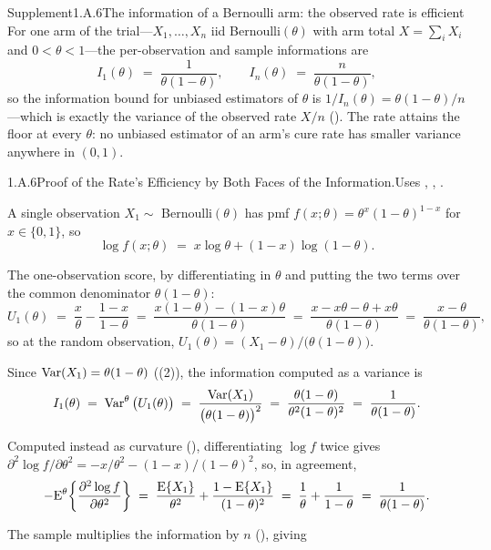 \documentclass[main.tex]{subfiles}
\begin{document}
\begin{ObjL}{Supplement}{1.A.6}{The information of a Bernoulli arm: the observed rate is efficient}
For one arm of the trial---$X_1,\dots,X_n$ iid Bernoulli$(\theta)$ with arm total
$X=\sum_i X_i$ and $0<\theta<1$---the per-observation and sample informations are
\[ I_1(\theta) \;=\; \frac{1}{\theta(1-\theta)}, \qquad
   I_n(\theta) \;=\; \frac{n}{\theta(1-\theta)} , \]
so the information bound for unbiased estimators of $\theta$ is
$1/I_n(\theta)=\theta(1-\theta)/n$---which is exactly the variance of the observed rate
$X/n$ (). The rate attains the floor at every $\theta$: no unbiased estimator of
an arm's cure rate has smaller variance anywhere in $(0,1)$.
\end{ObjL}
\begin{Prf}{1.A.6}{Proof of the Rate's Efficiency by Both Faces of the Information.}{Uses , , .}
\item A single observation $X_1\sim$ Bernoulli$(\theta)$ has pmf
      $f(x;\theta)=\theta^{x}(1-\theta)^{1-x}$ for $x\in\{0,1\}$, so
      \[ \log f(x;\theta) \;=\; x\log\theta + (1-x)\log(1-\theta) . \]
\item The one-observation score, by differentiating in $\theta$ and putting the two terms
      over the common denominator $\theta(1-\theta)$:
      \[ U_1(\theta) \;=\; \frac{x}{\theta}-\frac{1-x}{1-\theta}
         \;=\; \frac{x(1-\theta)-(1-x)\theta}{\theta(1-\theta)}
         \;=\; \frac{x-x\theta-\theta+x\theta}{\theta(1-\theta)}
         \;=\; \frac{x-\theta}{\theta(1-\theta)} , \]
      so at the random observation, $U_1(\theta)=(X_1-\theta)/\big(\theta(1-\theta)\big)$.
\item Since $\operatorname{Var}(X_1)=\theta(1-\theta)$ ((2)), the information computed as a
      variance is
      \[ I_1(\theta) \;=\; \operatorname{Var}^{\theta}\big(U_1(\theta)\big)
         \;=\; \frac{\operatorname{Var}(X_1)}{\big(\theta(1-\theta)\big)^2}
         \;=\; \frac{\theta(1-\theta)}{\theta^2(1-\theta)^2}
         \;=\; \frac{1}{\theta(1-\theta)} . \]
\item Computed instead as curvature (), differentiating $\log f$ twice gives
      $\partial^2\log f/\partial\theta^2 = -x/\theta^2 - (1-x)/(1-\theta)^2$, so, in
      agreement,
      \[ -\mathrm{E}^{\theta}\!\left\{\frac{\partial^2 \log f}{\partial\theta^2}\right\}
         \;=\; \frac{\mathrm{E}\{X_1\}}{\theta^2}+\frac{1-\mathrm{E}\{X_1\}}{(1-\theta)^2}
         \;=\; \frac{1}{\theta}+\frac{1}{1-\theta}
         \;=\; \frac{1}{\theta(1-\theta)} . \]
\item The sample multiplies the information by $n$ (), giving

\end{Prf}
\end{document}
